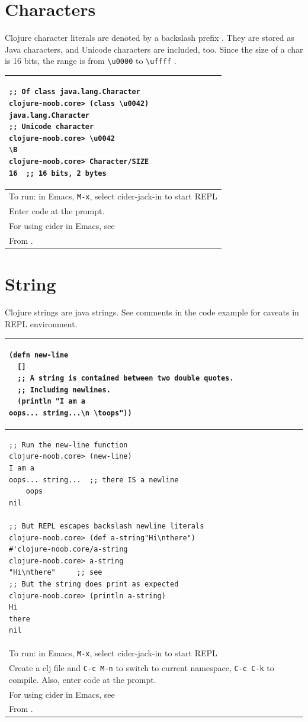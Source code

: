 \documentclass[12pt]{article}
\begin{document}
\part{Characters}
Clojure character literals are denoted by a backslash prefix \cite{fogus2014joy}. They are stored as Java characters, and Unicode characters are included, too. Since the size of a char is 16 bits, the range is from \texttt{\textbackslash u0000} to \texttt{\textbackslash uffff} \cite{oraclechar}.

\begin{tabular}{|p{}|}
\hline
\begin{verbatim}
;; Of class java.lang.Character
clojure-noob.core> (class \u0042)
java.lang.Character
;; Unicode character
clojure-noob.core> \u0042
\B
clojure-noob.core> Character/SIZE
16  ;; 16 bits, 2 bytes
\end{verbatim}
\\
\hline
To run: in Emacs, \texttt{M-x}, select cider-jack-in to start REPL\\
Enter code at the prompt.\\
For using cider in Emacs, see \cite{brave2015}\\
\hline
From \cite{fogus2014joy}.\\
\hline
\end{tabular}


\part{String}
Clojure strings are java strings. See comments in the code example for caveats in REPL environment.


\begin{tabular}{|p{}|}
\hline
\begin{verbatim}
(defn new-line
  []
  ;; A string is contained between two double quotes.
  ;; Including newlines.
  (println "I am a
oops... string...\n \toops"))
\end{verbatim}
\\
\hline
\begin{verbatim}
;; Run the new-line function
clojure-noob.core> (new-line)
I am a
oops... string...  ;; there IS a newline
 	oops
nil

;; But REPL escapes backslash newline literals
clojure-noob.core> (def a-string"Hi\nthere")
#'clojure-noob.core/a-string
clojure-noob.core> a-string
"Hi\nthere"     ;; see
;; But the string does print as expected
clojure-noob.core> (println a-string)
Hi
there
nil
\end{verbatim}
\\
\hline
To run: in Emacs, \texttt{M-x}, select cider-jack-in to start REPL\\
Create a clj file and \texttt{C-c M-n} to switch to current namespace, \texttt{C-c C-k} to compile. Also, enter code at the prompt.\\
For using cider in Emacs, see \cite{brave2015}\\
\hline
From \cite{fogus2014joy}.\\
\hline
\end{tabular}
\end{document}
